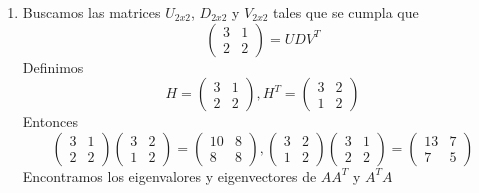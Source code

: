 \documentclass[12pt, letterpaper]{article}
\begin{document}
\begin{enumerate}
    \newpage
    \item Buscamos las matrices $U_{2x2}$, $D_{2x2}$ y $V_{2x2}$ tales que se cumpla que
    \begin{equation*}
        \begin{pmatrix}
            3 & 1 \\
            2 & 2
        \end{pmatrix}
        = UDV^{T}
    \end{equation*}
    Definimos
    \begin{equation*}
        H = \begin{pmatrix}
            3 & 1 \\
            2 & 2
        \end{pmatrix},
        H^{T} = \begin{pmatrix}
            3 & 2 \\
            1 & 2
        \end{pmatrix}
    \end{equation*}
    Entonces
    \begin{equation*}
        \begin{pmatrix}
            3 & 1 \\
            2 & 2
        \end{pmatrix}
        \begin{pmatrix}
            3 & 2 \\
            1 & 2
        \end{pmatrix}
        = \begin{pmatrix}
            10 & 8 \\
            8 & 8
        \end{pmatrix},
        \begin{pmatrix}
            3 & 2 \\
            1 & 2
        \end{pmatrix}
        \begin{pmatrix}
            3 & 1 \\
            2 & 2
        \end{pmatrix}
        = \begin{pmatrix}
            13 & 7 \\
            7 & 5
        \end{pmatrix}
    \end{equation*}
    Encontramos los eigenvalores y eigenvectores de $AA^{T}$ y $A^{T}A$
    \begin{equation*}
        \begin{aligned}

\end{aligned}
\end{equation*}
\end{enumerate}
\end{document}
